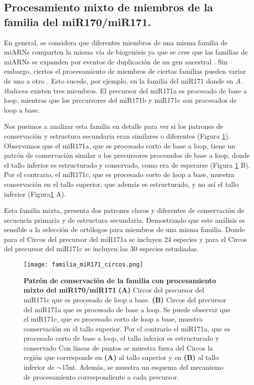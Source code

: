 \subsection{Procesamiento mixto de miembros de la familia del miR170/miR171.}

En general, se considera que diferentes miembros de una misma familia de miARNs comparten la misma vía de biogenésis ya que se cree que las familias de miARNs se expanden por eventos de duplicación de un gen ancestral \citep{pmid15565108}.
Sin embargo, ciertos el procesamiento de miembros de ciertas familias pueden variar de uno a otro \citep{Bologna2013}.
Esto sucede, por ejemplo, en la familia del miR171 donde en \textit{A. thaliana} existen tres miembros. 
El precursor del miR171a es procesado de base a loop, mientras que los precursores del miR171b y miR171c son procesados de loop a base.

Nos pusimos a analizar esta familia en detalle para ver si los patrones de conservación y estructura secundaria eran similares o diferentes (Figura \ref{fig:familia_miR171_circos}).
Observamos que el miR171a, que es procesado corto de base a loop, tiene un patrón de conservación similar a los precursores procesados de base a loop, donde el tallo inferior es estructurado y conservado, como era de esperarse (Figura \ref{fig:familia_miR171_circos} B).
Por el contrario, el miR171c, que es procesado corto de loop a base, muestra conservación en el tallo superior, que además es estructurado, y no así el tallo inferior (Figura\ref{fig:familia_miR171_circos} A).


Esta familia mixta, presenta dos patrones claros y diferentes de conservación de secuencia primaria y de estructura secundaria.
Demostrando que este análisis es sensible a la selección de ortólogos para miembros de una misma familia.
Donde para el Circos del precursor del miR171a se incluyen 24 especies y para el Circos del precursor del miR171c se incluyen las 30 especies estudiadas.

\begin{landscape}
    \begin{figure}[htbp!] 
        \centering    
        \texttt{[image: familia\_miR171\_circos.png]}
        \caption[Patrón de conservación de la familia con procesamiento mixto del miR170/miR171]{
        \textbf{Patrón de conservación de la familia con procesamiento mixto del miR170/miR171}
		 \textbf{(A)} Circos del precursor del miR171c que es procesado de loop a base.
		 \textbf{(B)} Circos del precursor del miR171a que es procesado de base a loop.
            Se puede observar que el miR171c, que es procesado corto de loop a base, muestra conservación en el tallo superior.
            Por el contrario el miR171a, que es procesado corto de base a loop, el tallo inferior es estructurado y conservado
			Con líneas de puntos se muestra fuera del Circos la región que corresponde en \textbf{(A)} al tallo superior y en \textbf{(B)} al tallo inferior de $\sim$15nt.
            Además, se muestra un esquema del mecanismo de procesamiento correspondiente a cada precursor.
			}
         \label{fig:familia_miR171_circos}
    \end{figure}
\end{landscape}


